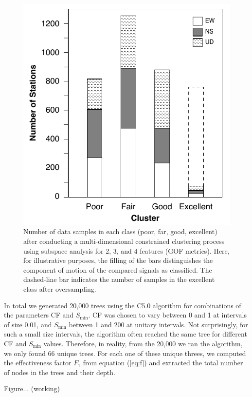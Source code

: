 \begin{figure}[t]
	\centering
	\includegraphics[width=\columnwidth]{figures/pdf/figure-07}
	\caption{Number of data samples in each class (poor, far, good, excellent) after conducting a multi-dimensional constrained \kmeans{} clustering process using subspace analysis for 2, 3, and 4 features (GOF metrics). Here, for illustrative purposes, the filling of the bars distinguishes the component of motion of the compared signals as classified. The dashed-line bar indicates the number of samples in the excellent class after oversampling.}
	\label{fig:count-classes}
\end{figure}

In total we generated 20,000 trees using the C5.0 algorithm for combinations of the parameters CF and $S_{\min}$. CF was chosen to vary between 0 and 1 at intervals of size 0.01, and $S_{\min}$ between 1 and 200 at unitary intervals. Not surprisingly, for such a small size intervals, the algorithm often reached the same tree for different CF and $S_{\min}$ values. Therefore, in reality, from the 20,000 we ran the algorithm, we only found 66 unique trees. For each one of these unique threes, we computed the effectiveness factor $F_1$ from equation (\ref{eq:f}) and extracted the total number of nodes in the trees and their depth.

Figure... (working)


